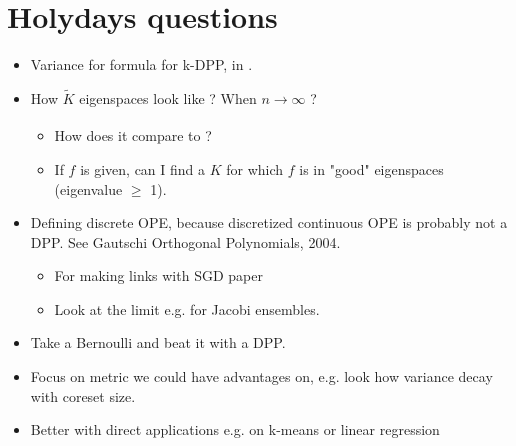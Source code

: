 \documentclass{article} %
\newcommand{\1}{\mathds{1}} %
\theoremstyle{definition} %
\begin{document}
\section{Holydays questions}
\begin{itemize}
	\item Variance for formula for k-DPP, in \cite{zhang2017dppminibatch}.
	\item How $\tilde K$ eigenspaces look like ? When $n \xrightarrow[]{} \infty$ ?
	\begin{itemize}
		\item How does it compare to \cite{bardenet2020mcdpp} ?
		\item If $f$ is given, can I find a $K$ for which $f$ is in "good" eigenspaces (eigenvalue $\geq$ 1).
	\end{itemize}
	\item Defining discrete OPE, because discretized continuous OPE is probably not a DPP. See Gautschi Orthogonal Polynomials, 2004.
	\begin{itemize}
		\item For making links with SGD paper \cite{bardenet2021sgddpp}
		\item Look at the limit e.g. for Jacobi ensembles. 
	\end{itemize}
\end{itemize}
\begin{itemize}
	\item Take a Bernoulli and beat it with a DPP.
	\item Focus on metric we could have advantages on, e.g. look how variance decay with coreset size. 
	\item Better with direct applications e.g. on k-means or linear regression
\end{itemize}
	
	\vfill
	
	
	\printbibliography
%	 
%	 
	
\end{document}
